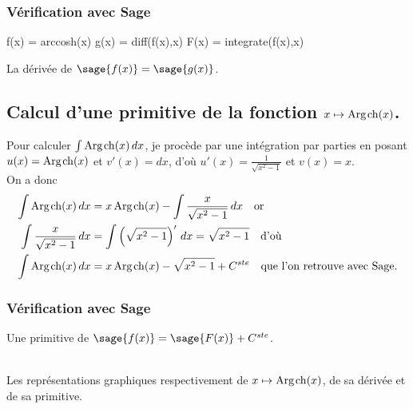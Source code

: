 \documentclass[a4paper,12pt]{report}
\renewcommand{\cosh}{\mathop{\mathrm{ch}}}
\renewcommand{\arg}{\mathop{\mathrm{Arg}}}
\begin{document}
\subsubsection{Vérification avec Sage}


\begin{sageblock}
    f(x) = arccosh(x)
    g(x) = diff(f(x),x)
    F(x) = integrate(f(x),x)
\end{sageblock}

La dérivée de $\sage{f(x)} = \sage{g(x)} $.


\subsection{Calcul d'une primitive de la fonction  $x \mapsto \arg\mspace{-1mu}\cosh(x)$.}

Pour calculer $\int \arg\mspace{-1mu}\cosh(x) \, dx$, je procède par une intégration par parties en posant $u(x) = \arg\mspace{-1mu}\cosh(x)$ et $v'(x) = dx$, d'où $u'(x) = \frac{1}{ \sqrt{x^2-1}}$ et $ v(x) = x $. \\
On a donc
\begin{align*}
\int \arg\mspace{-1mu}\cosh(x) \, dx & = x \arg\mspace{-1mu}\cosh(x) - \int \frac{x}{ \sqrt{x^2-1}} \, dx \quad \textrm{or}\\
\int \frac{x}{ \sqrt{x^2-1}} \, dx & = \int \left(\sqrt{x^2-1}\right)' \, dx = \sqrt{x^2-1}  \quad \textrm{d'où}\\
\int \arg\mspace{-1mu}\cosh(x) \, dx & = x \arg\mspace{-1mu}\cosh(x) - \sqrt{x^2-1} + C^{ste} \quad \textrm{que l'on retrouve avec Sage.}
\end{align*}


\subsubsection{Vérification avec Sage}

Une primitive de $\sage{f(x)} = \sage{F(x)} + C^{ste} $.

\begin{center}
\\
Les représentations graphiques respectivement de $x \mapsto \arg\mspace{-1mu}\cosh(x)$, de sa dérivée et de sa primitive.
\end{center}
\end{document}
